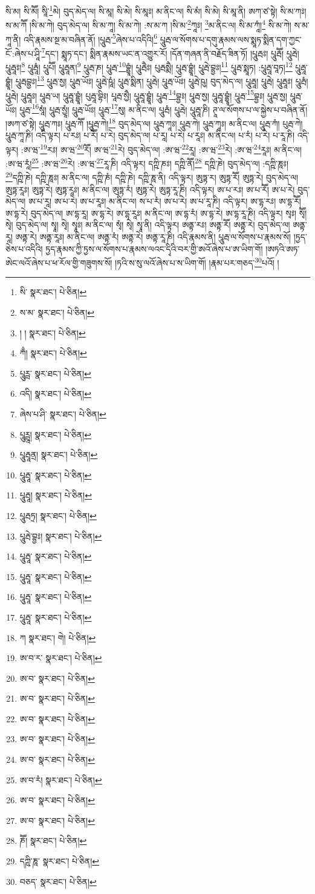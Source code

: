 སི་མ། སི་མཽ། སཱི་\footnote{སི་  སྣར་ཐང་།  པེ་ཅིན། }མེ། བུད་མེད་ལ། སི་མཱ། སི་མེ། སི་མཱཿ། མ་ནིང་ལ། སི་མཾ། སི་མེ། སི་མཱ་ནི། ཨཀ་ཙ་སྟེ། སི་མ་ཀཿ། ས་མ་ཀཽ །སི་མ་ཀེ། བུད་མེད་ལ། སི་མ་ཀཱ། སི་མ་ཀེ། :ས་མ་ཀ །སི་མ་\footnote{ས་མ་  སྣར་ཐང་།  པེ་ཅིན། }ཀཱཿ། \footnote{། །   སྣར་ཐང་།  པེ་ཅིན། }མ་ནིང་ལ། སི་མ་ཀཱཾ།\footnote{ཀྃ།  སྣར་ཐང་།  པེ་ཅིན། } སི་མ་ཀེ། ས་མ་ཀཱ་ནི། འདི་རྣམས་སྔ་མ་བཞིན་ནོ། །པཱུརྦ་\footnote{པཱུཪྦ་  སྣར་ཐང་།  པེ་ཅིན། }ཞེས་པ་འདིའི།\footnote{འདི།  སྣར་ཐང་།  པེ་ཅིན། } པཱུརྦ་ལ་སོགས་པ་དགུ་རྣམས་ལས་སྨཱཏ་སྨིན་དག་ཀྱང་ངོ་:ཞེས་པ་ཤཱི་\footnote{ཞེས་པ་ཤི་  སྣར་ཐང་།  པེ་ཅིན། }དང་། སྨཱཏ་དང་། སྨིན་རྣམས་ཡང་ན་འགྱུར་རོ། །དོན་གཞན་ནི་བརྗོད་ཟིན་ཏོ། །པཱུརྦཿ། པཱུརྦཽ། པཱུརྦེ། པཱུརྦཱཿ།\footnote{པཱུཪྦཱ།  སྣར་ཐང་།  པེ་ཅིན། } པཱུརྦཱཾ། པཱུཔཽ། པཱུརྦཱན།\footnote{པཱུརྦཱནྲ།  སྣར་ཐང་།  པེ་ཅིན། } པཱུརྦ་ཎ། པཱུརྦ་\footnote{པཱུརྦཱ་  སྣར་ཐང་།  པེ་ཅིན། }བྷྱཱཾ། པཱུརྦཻཿ། པུརྦསྨཻ། པཱུརྦ་བྷྱཱཾ། པཱུརྦེ་བྷྱཿ།\footnote{པཱུརྦཱ།  སྣར་ཐང་།  པེ་ཅིན། } པཱུརྦ་སྨཱཏ། :པཱུརྦཱ་བཱཏ།\footnote{པཱུརྦཏྲ།  སྣར་ཐང་།  པེ་ཅིན། } པཱུརྦཱ་བྷྱཱཾ། པཱུརྦབྷྱཿ།\footnote{པཱུརྦེ་བྷྱཿ།  སྣར་ཐང་།  པེ་ཅིན། } པཱུརྦ་སྱ། པཱུརྦ་ཡོཿ། པཱུརྦེ་ཥཱཾ། པཱུརྦ་སྨིན། པཱུརྦེ། པཱུརྦ་ཡོཿ། པཱུརྦེ་ཥུ། བུད་མེད་ལ། པཱུརྦཱ། པཱུརྦེ། པཱུརྦཱཿ། པཱུརྦཾ། པཱུརྦེ། པཱུརྦཱཿ། པཱུརྦ་ཡ། པཱུརྦཱ་བྷྱཱཾ། པུརྦཱ་བྷིཿ། པཱརྦ་སྱཻ། པཱུརྦཱ་བྷྱཱཾ། པཱུརྦ་\footnote{པཱུརྦཱ་  སྣར་ཐང་།  པེ་ཅིན། }བྷྱཿ། པཱུརྦ་སྱ། པཱུརྦཱ་བྷྱཱཾ། པཱུརྦ་\footnote{པཱུརྦཱ་  སྣར་ཐང་།  པེ་ཅིན། }བྷྱཿ། པཱུརྦ་སྱ། པཱུརྦ་ཡོཿ། པཱུརྦ་\footnote{པཱུརྦཱ་  སྣར་ཐང་།  པེ་ཅིན། }སཱཾ། པཱུརྦ་སྱཱཾ། པཱུརྦ་ཡོཿ། པཱུརྦ་\footnote{པཱུརྦཱ་  སྣར་ཐང་།  པེ་ཅིན། }སུ། མ་ནིང་ལ། པཱུརྦཾ། པཱུརྦེ། པཱུརྦཱ་ཎི། ཊཱ་ལ་སོགས་པ་ལ་སྐྱེས་པ་བཞིན་ནོ། །ཨཀ་ཙ་སྟེ། པཱུརྦ་ཀཿ། པཱུརྦ་ཀཽ །པཱུརྦ་ཀེ།\footnote{ཀ  སྣར་ཐང་། གེ།  པེ་ཅིན། } བུད་མེད་ལ། པཱུརྦ་ཀཱཿ། པཱུརྦ་ཀེ། པཱུརྦ་ཀཱཿ། མ་ནིང་ལ། པཱུརྦ་ཀཾ། པུརྦ་ཀེ། པཱུརྦ་ཀཱ་ཎི། འདི་ལྟར། པ་རཿ། པ་རཽ། པ་རེ། བུད་མེད་ལ། པ་རཱ། པ་རེ། པ་རཱཿ། མ་ནིང་ལ། པ་རཾ། པ་རེ། པ་རཱ་ཎི། འདི་ལྟར། :ཨ་ཝ་\footnote{ཨ་བ་ར་  སྣར་ཐང་།  པེ་ཅིན། }རཿ། ཨ་ཝ་\footnote{ཨ་བ་  སྣར་ཐང་།  པེ་ཅིན། }རཽ། ཨ་ཝ་\footnote{ཨ་བ་  སྣར་ཐང་།  པེ་ཅིན། }རེ། བུད་མེད་ལ། :ཨ་ཝ་\footnote{ཨ་བ་  སྣར་ཐང་།  པེ་ཅིན། }རཱ། :ཨ་ཝ་\footnote{ཨ་བ་  སྣར་ཐང་།  པེ་ཅིན། }རེ། :ཨ་ཝ་\footnote{ཨ་བ་  སྣར་ཐང་།  པེ་ཅིན། }རཱཿ། མ་ནིང་ལ། :ཨ་ཝ་རཱཾ།\footnote{ཨ་བ་རཾ།  སྣར་ཐང་།  པེ་ཅིན། } :ཨ་ཝ་\footnote{ཨ་བ་  སྣར་ཐང་།  པེ་ཅིན། }རེ། :ཨ་ཝ་\footnote{ཨ་བ་  སྣར་ཐང་།  པེ་ཅིན། }རཱ་ཎི། འདི་ལྟར། དཀྵི་ཎཿ། དཀྵི་ནཽ།\footnote{ཎཽ།  སྣར་ཐང་།  པེ་ཅིན། } དཀྵི་ཎེ། བུད་མེད་ལ། :དཀྵི་ཎཱཿ། \footnote{དཀྵི་ཎཱ་  སྣར་ཐང་།  པེ་ཅིན། }དཀྵི་ཎེ། དཀྵི་ཎཱཿ། མ་ནིང་ལ། དཀྵི་ཎཾ། དཀྵི་ཎེ། དཀྵི་ཎཱ་ནི། འདི་ལྟར། ཨུཏྟ་ར། ཨུཏྟ་རཽ། ཨུཏྟ་རེ། བུད་མེད་ལ། ཨུཏྟ་རཱཿ། ཨུཏྟ་རེ། ཨུཏྟ་རཱཿ། མ་ནིང་ལ། ཨུཏྟ་རཾ། ཨུཏྟ་རེ། ཨུཏྟ་རཱ་ཎི། འདི་ལྟར། ཨ་པ་རཿ། ཨ་པ་རཽ། ཨ་པ་རེ། བུད་མེད་ལ། ཨ་པ་རཱ། ཨ་པ་རེ། ཨ་པ་རཱཿ། མ་ནིང་ལ། ས་པ་རཾ། ཨ་པ་རེ། ཨ་པ་རཱ་ཎི། འདི་ལྟར། ཨ་དྷ་རཿ། ཨ་དྷ་རཽ། ཨ་དྷ་རེ། བུད་མེད་ལ། ཨ་དྷ་རཱ། ཨ་དྷ་རེ། ཨ་དྷ་རཱཿ། མ་ནིང་ལ། ཨ་དྷ་རཾ། ཨ་དྷ་རེ། ཨ་དྷ་རཱ་ཎི། འདི་ལྟར། སྭཿ། སྭཽ། སྭེ། བུད་མེད་ལ། སྭཱ། སྭེ། སྭཱཿ། མ་ནིང་ལ། སྭཾ། སྭེ། སྭཱ་ནི། འདི་ལྟར། ཨནྟ་རཿ། ཨནྟ་རཽ། ཨནྟ་རེ། བུད་མེད་ལ། ཨནྟ་རཱ། ཨནྟ་རེ། ཨནྟ་རཱཿ། མ་ནིང་ལ། ཨནྟ་རཾ། ཨནྟ་རེ། ཨནྟ་རཱ་ཎི། འདི་རྣམས་ནི། པཱུརྦ་ལ་སོགས་པ་རྣམས་སོ། །ཏྱད་ཅེས་པ་འདིའི། ཏྱད་རྣམས་ཀྱི་ཏྱས་ལ་སོགས་པ་རྣམས་ལའང་དྭིའི་བར་གྱི་ཨའོ་ཞེས་པ་ཨ་ཡིག་གོ། །ཨཏའི་ཨཏ་ཨེང་ལའོ་ཞེས་པ་ཕ་རོལ་གྱི་གཟུགས་སོ། །ཏའི་ས་སུ་ལའོ་ཞེས་པ་ས་ཡིག་གོ། །རྣམ་པར་གཅད་\footnote{བཅད་  སྣར་ཐང་།  པེ་ཅིན། }པའོ། །
